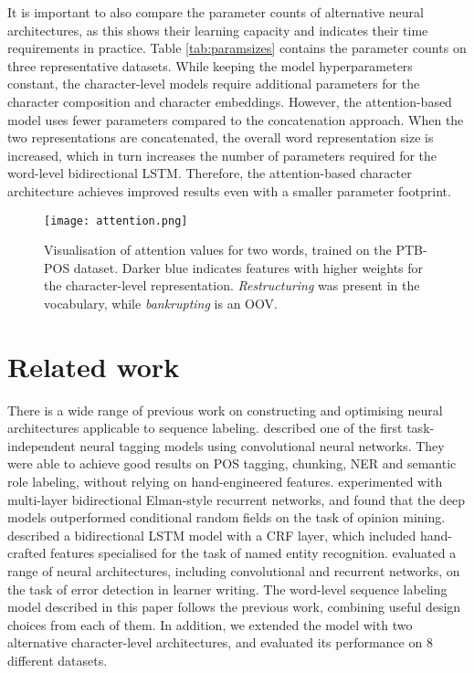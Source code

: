 \documentclass[11pt]{article}
\begin{document}
It is important to also compare the parameter counts of alternative neural architectures, as this shows their learning capacity and indicates their time requirements in practice. Table \ref{tab:paramsizes} contains the parameter counts on three representative datasets. While keeping the model hyperparameters constant, the character-level models require additional parameters for the character composition and character embeddings. However, the attention-based model uses fewer parameters compared to the concatenation approach. When the two representations are concatenated, the overall word representation size is increased, which in turn increases the number of parameters required for the word-level bidirectional LSTM. Therefore, the attention-based character architecture achieves improved results even with a smaller parameter footprint. 





\begin{figure}[t]
    \centering
	\texttt{[image: attention.png]}
	\caption{Visualisation of attention values for two words, trained on the PTB-POS dataset. Darker blue indicates features with higher weights for the character-level representation. \textit{Restructuring} was present in the vocabulary, while \textit{bankrupting} is an OOV.}
	\label{fig:attention}
\end{figure}










\section{Related work}

There is a wide range of previous work on constructing and optimising neural architectures applicable to sequence labeling.
 described one of the first task-independent neural tagging models using convolutional neural networks. They were able to achieve good results on POS tagging, chunking, NER and semantic role labeling, without relying on hand-engineered features. 
 experimented with multi-layer bidirectional Elman-style recurrent networks, and found that the deep models outperformed conditional random fields on the task of opinion mining.
 described a bidirectional LSTM model with a CRF layer, which included hand-crafted features specialised for the task of named entity recognition.
 evaluated a range of neural architectures, including convolutional and recurrent networks, on the task of error detection in learner writing.
The word-level sequence labeling model described in this paper follows the previous work, combining useful design choices from each of them.
In addition, we extended the model with two alternative character-level architectures, and evaluated its performance on 8 different datasets.
\end{document}
